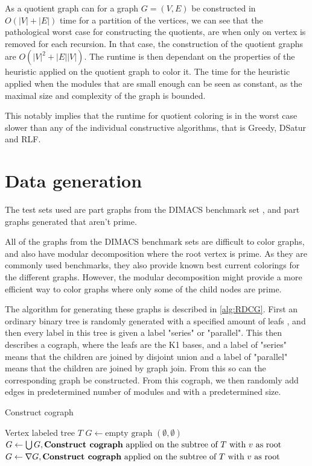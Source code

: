 \documentclass[a4paper]{article}
\begin{document}
As a quotient graph can for a graph $G = (V,E)$ be constructed in
$O(|V|+|E|)$ time for a partition of the vertices, we can see that the pathological
worst case for constructing the quotients, are when only on vertex is removed
for each recursion. In that case, the construction of the quotient graphs are
$O(|V|^2+|E||V|)$. The runtime is then dependant on the properties of the
heuristic applied on the quotient graph to color it. The time for the heuristic
applied when the modules that are small enough can be seen as constant, as the
maximal size and complexity of the graph is bounded. 

This notably implies that the runtime for quotient coloring is in the worst 
case slower than any of the individual constructive algorithms, that is 
Greedy, DSatur and RLF.
\section{Data generation}
\label{sec:Data}

The test sets used are part graphs from the DIMACS benchmark set \cite{DIMACS}, 
and part graphs generated that aren't prime.

All of the graphs from the DIMACS benchmark sets are difficult to color graphs,
and also have modular decomposition where the root vertex is prime. As they are
commonly used benchmarks, they also provide known best current colorings for the
different graphs. However, the modular decomposition might provide a more
efficient way to color graphs where only some of the child nodes are prime. 

The algorithm for generating these graphs is described in \autoref{alg:RDCG}.
First an ordinary binary tree is randomly generated with a specified amount of
leafs , and then every label in this tree is given a label "series" or
"parallel".  This then describes a cograph, where the leafs are the K1 bases,
and a label of "series" means that the children are joined by disjoint union and
a label of "parallel" means that the children are joined by graph join.  From
this so can the corresponding graph be constructed. From this cograph, we then
randomly add edges in predetermined number of modules and with a predetermined
size. 

\begin{algorithm}[H]
    \caption{Construct cograph}
   \begin{algorithmic}[1]
        \REQUIRE Vertex labeled tree $T$
        \ENDIF
        \STATE $G \leftarrow \text{empty graph $(\emptyset,\emptyset)$}$
                \STATE $G \leftarrow \bigcup G, \text{\textbf{Construct cograph} applied
                on the subtree of $T$ with $v$ as root} $
                \STATE $G \leftarrow \nabla G, \text{\textbf{Construct cograph} applied
                on the subtree of $T$ with $v$ as root}$
            \ENDIF
        \ENDFOR
    \end{algorithmic}
\end{algorithm}
\end{document}
